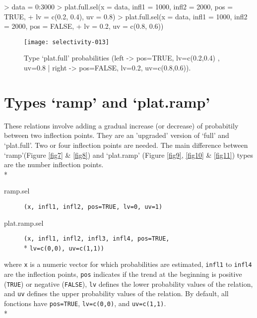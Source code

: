 \documentclass[letterpaper, 12pt]{article}
\begin{document}
\begin{Schunk}
\begin{Sinput}
> data = 0:3000
> plat.full.sel(x = data, infl1 = 1000, infl2 = 2000, pos = TRUE, 
+     lv = c(0.2, 0.4), uv = 0.8)
> plat.full.sel(x = data, infl1 = 1000, infl2 = 2000, pos = FALSE, 
+     lv = 0.2, uv = c(0.8, 0.6))
\end{Sinput}
\end{Schunk}
\begin{figure}[h]
\vspace{-20pt}
\begin{center}
\texttt{[image: selectivity-013]}
\end{center}
\vspace{-30pt}
\caption{Type `plat.full' probabilities (left -> pos=TRUE, lv=c(0.2,0.4) , uv=0.8 | right -> pos=FALSE, lv=0.2, uv=c(0.8,0.6)).}
\vspace{-10pt}
\label{fig6}
\end{figure}



\newpage

\section{Types `ramp' and `plat.ramp'}
\noindent These relations involve adding a gradual increase (or decrease) of probabitily between two inflection points. 
They are an 'upgraded' version of `full' and `plat.full'. Two or four inflection points are needed. 
The main difference between `ramp'(Figure \ref{fig7} \& \ref{fig8}) and `plat.ramp' (Figure \ref{fig9}, \ref{fig10} \& \ref{fig11}) 
types are the number inflection points.\\*
			
\begin{description}
\item[ramp.sel]\verb#(x, infl1, infl2, pos=TRUE, lv=0, uv=1)#
\item[plat.ramp.sel]\verb#(x, infl1, infl2, infl3, infl4, pos=TRUE,# \\* \verb#lv=c(0,0), uv=c(1,1))#
\end{description}
where \verb#x# is a numeric vector for which probabilities are estimated, \verb#infl1# to \verb#infl4# are the inflection points,  \verb#pos# indicates if the trend at the beginning is positive  (\verb#TRUE#) or negative (\verb#FALSE#), \verb#lv# defines the 
lower probability values of the relation, and \verb#uv# defines the upper probability values of the relation. By default, 
all fonctions have \verb#pos=TRUE#, \verb#lv=c(0,0)#, and \verb#uv=c(1,1)#.\\*
\end{document}
